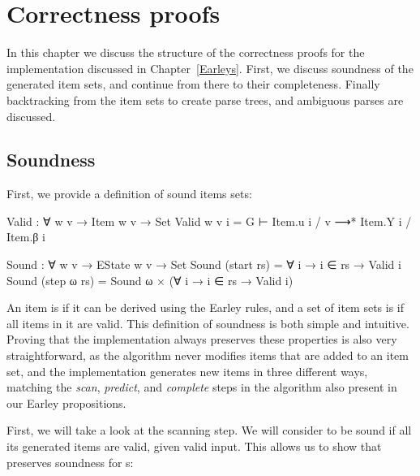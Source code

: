 
\chapter{Correctness proofs} \label{Correctness}

	In this chapter we discuss the structure of the correctness proofs for the
	implementation discussed in Chapter~\ref{Earleys}. First, we discuss
	soundness of the generated item sets, and continue from there to their
	completeness. Finally backtracking from the item sets to create parse
	trees, and ambiguous parses are discussed.

	\section{Soundness}

		First, we provide a definition of sound items sets:

		\begin{code}
			Valid : ∀ {w v} → Item w v → Set
			Valid {w} {v} i = G ⊢ Item.u i / v ⟶* Item.Y i / Item.β i

			Sound : ∀ {w v} → EState w v → Set
			Sound (start rs) = ∀ {i} → i ∈ rs → Valid i
			Sound (step ω rs) = Sound ω × (∀ {i} → i ∈ rs → Valid i)
		\end{code}

		An item is  if it can be derived using the Earley rules,
		and a set of item sets is  if all items in it are valid.
		This definition of soundness is both simple and intuitive. Proving that
		the implementation always preserves these properties is also very
		straightforward, as the algorithm never modifies items that are added
		to an item set, and the implementation generates new items in three
		different ways, matching the \emph{scan}, \emph{predict}, and
		\emph{complete} steps in the algorithm also present in our Earley
		propositions.

		First, we will take a look at the scanning step. We will consider
		 to be sound if all its generated items are valid, given
		valid input. This allows us to show that  preserves
		soundness for s:

